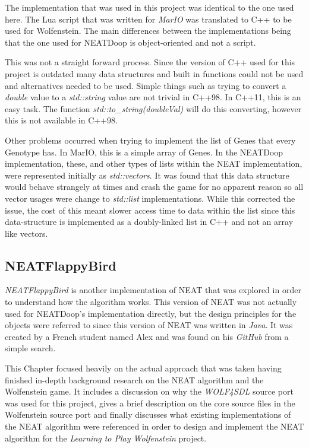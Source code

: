 \documentclass[]{Learning-to-Play-Wolfenstein-thesis}
\begin{document}
The implementation that was used in this project was identical to the one used here. The Lua script that was written for \textit{MarIO} was translated to C++ to be used for Wolfenstein. The main differences between the implementations being that the one used for NEATDoop is object-oriented and not a script.

This was not a straight forward process. Since the version of C++ used for this project is outdated many data structures and built in functions could not be used and alternatives needed to be used. Simple things such as trying to convert a \textit{double} value to a \textit{std::string} value are not trivial in C++98. In C++11, this is an easy task. The function \textit{std::to\_string(doubleVal)} will do this converting, however this is not available in C++98.

Other problems occurred when trying to implement the list of Genes that every Genotype has. In MarIO, this is a simple array of Genes. In the NEATDoop implementation, these, and other types of lists within the NEAT implementation, were represented initially as \textit{std::vectors}. It was found that this data structure would behave strangely at times and crash the game for no apparent reason so all vector usages were change to \textit{std::list} implementations. While this corrected the issue, the cost of this meant slower access time to data within the list since this data-structure is implemented as a doubly-linked list in C++ and not an array like vectors. 

\subsection{NEATFlappyBird}
\textit{NEATFlappyBird} is another implementation of NEAT that was explored in order to understand how the algorithm works. This version of NEAT was not actually used for NEATDoop's implementation directly, but the design principles for the objects were referred to since this version of NEAT was written in \textit{Java}. It was created by a French student named Alex and was found on his \textit{GitHub} from a simple search.



This Chapter focused heavily on the actual approach that was taken having finished in-depth background research on the NEAT algorithm and the Wolfenstein game. It includes a discussion on why the \textit{WOLF4SDL} source port was used for this project, gives a brief description on the core source files in the Wolfenstein source port and finally discusses what existing implementations of the NEAT algorithm were referenced in order to design and implement the NEAT algorithm for the \textit{Learning to Play Wolfenstein} project.
\end{document}
